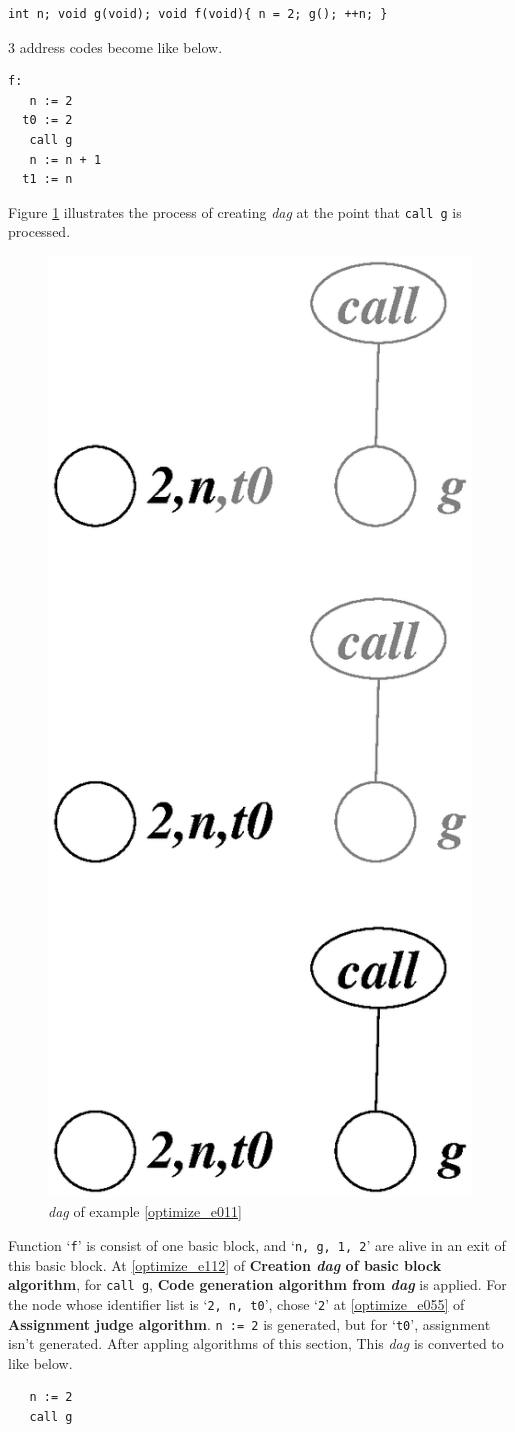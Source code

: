 \begin{Example}
\label{optimize_e011}
\begin{verbatim}
int n; void g(void); void f(void){ n = 2; g(); ++n; }
\end{verbatim}
3 address codes become like below.
\begin{verbatim}
f:
   n := 2
  t0 := 2
   call g
   n := n + 1
  t1 := n
\end{verbatim}
Figure \ref{optimize_e012} illustrates the process of creating
{\em dag} at the point that {\tt{call g}} is processed.

\begin{figure}[htbp]
\begin{center}
\includegraphics[width=0.530\linewidth,height=1.0\linewidth]{opt003.eps}
\caption{{\em dag} of example \ref{optimize_e011}}
\label{optimize_e012}
\end{center}
\end{figure}
Function `{\tt{f}}' is consist of one basic block, and 
`{\tt{n, g, 1, 2}}' are alive in an exit of this basic block.
At \ref{optimize_e112} of {\bf Creation {\em dag} of basic block algorithm},
for {\tt{call g}},
{\bf Code generation algorithm from {\em dag}} is applied.
For the node whose identifier list is `{\tt{2, n, t0}}',
chose `{\tt{2}}'
at \ref{optimize_e055} of {\bf Assignment judge algorithm}.
{\tt{n := 2}} is generated, but for `{\tt{t0}}', 
assignment isn't generated. 
After appling algorithms of this section,
This {\em dag} is converted to like below.
\begin{verbatim}
   n := 2
   call g
\end{verbatim}
\end{Example}

